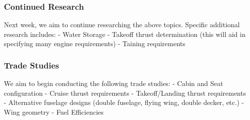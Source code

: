\documentclass[12pt]{article}
\begin{document}
\subsubsection{Continued Research}\label{continued-research}

Next week, we aim to continue researching the above topics. Specific
additional research includes: - Water Storage - Takeoff thrust
determination (this will aid in specifying many engine requirements) -
Taining requirements

\subsubsection{Trade Studies}\label{trade-studies}

We aim to begin conducting the following trade studies: - Cabin and Seat
configuration - Cruise thrust requirements - Takeoff/Landing thrust
requirements - Alternative fuselage designs (double fuselage, flying
wing, double decker, etc.) - Wing geometry - Fuel Efficiencies
\end{document}

